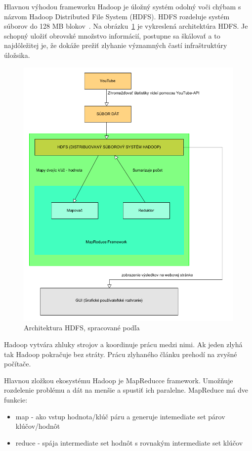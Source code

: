 \documentclass[10pt,slovak,a4paper]{article}
\begin{document}
Hlavnou výhodou frameworku Hadoop je úložný systém odolný voči chýbam s názvom Hadoop Distributed File System (HDFS). HDFS rozdeluje systém súborov do 128 MB blokov~\cite{HDFS}. Na obrázku~\ref{HadoopObrazok} je vykreslená architektúra HDFS. Je schopný uložiť obrovské množstvo informácií, postupne sa škálovať a to najdôležitej je, že dokáže prežiť zlyhanie významných častí infraštruktúry úložsika.
\begin{figure}[H]
  \centering
  \includegraphics[width=1\textwidth]{HDFS_prelozene.png}
  \caption{Architektura HDFS, spracované podľa \cite{HadoopObrazok}}
  \label{HadoopObrazok}
\end{figure}

Hadoop vytvára zhluky strojov a koordinuje prácu medzi nimi. Ak jeden zlyhá tak Hadoop pokračuje bez stráty. Prácu zlyhaného článku prehodí na zvyšné počítače.

Hlavnou zložkou ekosystému Hadoop je MapReducce framework. Umožňuje rozdelenie problému a dát na menšie a spustiť ich paralelne. MapReduce má dve funkcie:

\begin{itemize}
\item map - ako vstup hodnota/klúč páru a generuje intemediate set párov klúčov/hodnôt
\item reduce - spája intermediate set hodnôt s rovnakým intermediate set klúčov
\end{itemize}
\cite{ZakladneInfo}
\end{document}
